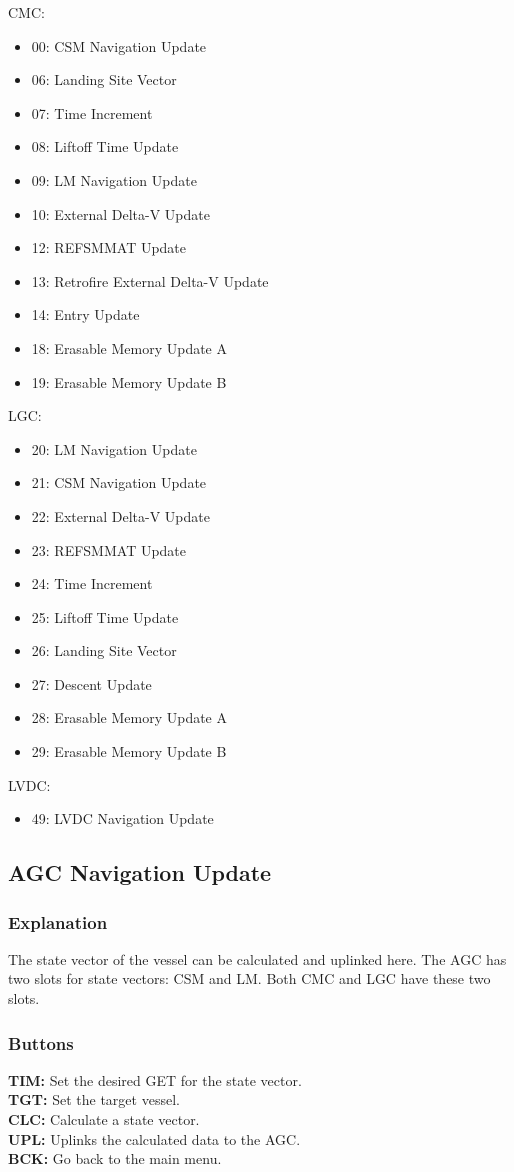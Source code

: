 \documentclass[11pt]{article} %
\begin{document}
CMC:
\begin{itemize}
\item 00: CSM Navigation Update
\item 06: Landing Site Vector
\item 07: Time Increment
\item 08: Liftoff Time Update
\item 09: LM Navigation Update
\item 10: External Delta-V Update
\item 12: REFSMMAT Update
\item 13: Retrofire External Delta-V Update
\item 14: Entry Update
\item 18: Erasable Memory Update A
\item 19: Erasable Memory Update B
\end{itemize}
LGC:\\
\begin{itemize}
\item 20: LM Navigation Update
\item 21: CSM Navigation Update
\item 22: External Delta-V Update
\item 23: REFSMMAT Update
\item 24: Time Increment
\item 25: Liftoff Time Update
\item 26: Landing Site Vector
\item 27: Descent Update
\item 28: Erasable Memory Update A
\item 29: Erasable Memory Update B
\end{itemize}
\newpage
LVDC:\\
\begin{itemize}
\item 49: LVDC Navigation Update
\end{itemize}
\newpage
\subsection{AGC Navigation Update}
\subsubsection{Explanation}
The state vector of the vessel can be calculated and uplinked here. The AGC has two slots for state vectors: CSM and LM.  Both CMC and LGC have these two slots.
\subsubsection{Buttons}
\textbf{TIM:} Set the desired GET for the state vector.\\
\textbf{TGT:} Set the target vessel.\\
\textbf{CLC:} Calculate a state vector.\\
\textbf{UPL:} Uplinks the calculated data to the AGC.\\
\textbf{BCK:} Go back to the main menu.\\
\end{document}
